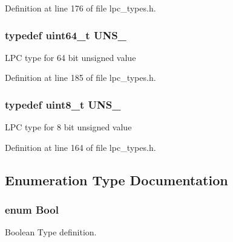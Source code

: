 Definition at line 176 of file lpc\+\_\+types.\+h.

\subsubsection[{\texorpdfstring{U\+N\+S\+\_\+64}{UNS_64}}]{\setlength{\rightskip}{0pt plus 5cm}typedef uint64\+\_\+t {\bf U\+N\+S\+\_}}\hypertarget{group__LPC__Types__Public__Types_ga2299199b92f0535ad8c2e2d8c7c7f09b}{}\label{group__LPC__Types__Public__Types_ga2299199b92f0535ad8c2e2d8c7c7f09b}
L\+PC type for 64 bit unsigned value 

Definition at line 185 of file lpc\+\_\+types.\+h.

\subsubsection[{\texorpdfstring{U\+N\+S\+\_\+8}{UNS_8}}]{\setlength{\rightskip}{0pt plus 5cm}typedef uint8\+\_\+t {\bf U\+N\+S\+\_}}\hypertarget{group__LPC__Types__Public__Types_ga7353117656180c64d2216c874998b98b}{}\label{group__LPC__Types__Public__Types_ga7353117656180c64d2216c874998b98b}
L\+PC type for 8 bit unsigned value 

Definition at line 164 of file lpc\+\_\+types.\+h.



\subsection{Enumeration Type Documentation}
\subsubsection[{\texorpdfstring{Bool}{Bool}}]{\setlength{\rightskip}{0pt plus 5cm}enum {\bf Bool}}\hypertarget{group__LPC__Types__Public__Types_ga39db6982619d623273fad8a383489309}{}\label{group__LPC__Types__Public__Types_ga39db6982619d623273fad8a383489309}


Boolean Type definition. 

